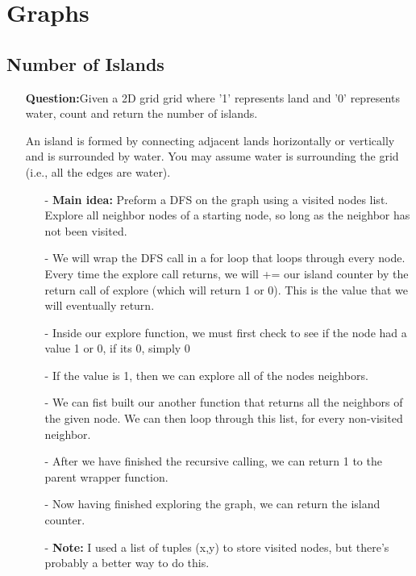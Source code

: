 \documentclass[12pt]{article}
\begin{document}
\section{Graphs}

\subsection{Number of Islands}
\begin{enumerate}
  \item[] \textbf{Question:}Given a 2D grid grid where '1' represents land and '0' represents water, count and return the number of islands.

An island is formed by connecting adjacent lands horizontally or vertically and is surrounded by water. You may assume water is surrounding the grid (i.e., all the edges are water). 

    \begin{enumerate}
      \item[-] \textbf{Main idea:} Preform a DFS on the graph using a visited nodes list. Explore all neighbor nodes of a starting node, so long as the neighbor has not been visited. 
      \item[-] We will wrap the DFS call in a for loop that loops through every node. Every time the explore call returns, we will += our island counter by the return call of explore (which will return 1 or 0). This is the value that we will eventually return.
      \item[-] Inside our explore function, we must first check to see if the node had a value 1 or 0, if its 0, simply 0
      \item[-] If the value is 1, then we can explore all of the nodes neighbors. 
      \item[-] We can fist built our another function that returns all the neighbors of the given node. We can then loop through this list, for every non-visited neighbor.
      \item[-] After we have finished the recursive calling, we can return 1 to the parent wrapper function. 
      \item[-] Now having finished exploring the graph, we can return the island counter. 
      \item[-] \textbf{Note:} I used a list of tuples (x,y) to store visited nodes, but there's probably a better way to do this. 
    \end{enumerate}
\end{enumerate}
\end{document}
